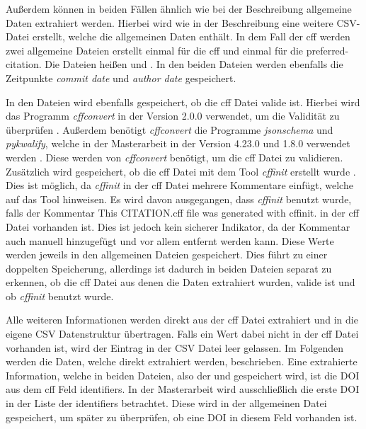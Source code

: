 Außerdem können in beiden Fällen ähnlich wie bei der Beschreibung allgemeine Daten extrahiert werden.
Hierbei wird wie in der Beschreibung eine weitere CSV-Datei erstellt, welche die allgemeinen Daten enthält.
In dem Fall der \gls{cff} werden zwei allgemeine Dateien erstellt einmal für die \gls{cff} und einmal für die \glqq preferred-citation\grqq{}.
Die Dateien heißen  und .
In den beiden Dateien werden ebenfalls die Zeitpunkte \emph{commit date} und \emph{author date} gespeichert.

In den Dateien wird ebenfalls gespeichert, ob die \gls{cff} Datei valide ist.
Hierbei wird das Programm \emph{cffconvert} in der Version 2.0.0 verwendet, um die Validität zu überprüfen \autocite{spaaks_cffconvert_2021}.
Außerdem benötigt \emph{cffconvert} die Programme \emph{jsonschema} und \emph{pykwalify}, welche in der Masterarbeit in der Version 4.23.0 und 1.8.0 verwendet werden \autocites{noauthor_python-jsonschemajsonschema_2024}{grokzen_grokzenpykwalify_2024}.
Diese werden von \emph{cffconvert} benötigt, um die \gls{cff} Datei zu validieren.
Zusätzlich wird gespeichert, ob die \gls{cff} Datei mit dem Tool \emph{cffinit} erstellt wurde \autocite{spaaks_cffinit_2023}.
Dies ist möglich, da \emph{cffinit} in der \gls{cff} Datei mehrere Kommentare einfügt, welche auf das Tool hinweisen.
Es wird davon ausgegangen, dass \emph{cffinit} benutzt wurde, falls der Kommentar \glqq This CITATION.cff file was generated with cffinit.\grqq{} in der \gls{cff} Datei vorhanden ist.
Dies ist jedoch kein sicherer Indikator, da der Kommentar auch manuell hinzugefügt und vor allem entfernt werden kann.
Diese Werte werden jeweils in den allgemeinen Dateien gespeichert.
Dies führt zu einer doppelten Speicherung, allerdings ist dadurch in beiden Dateien separat zu erkennen, ob die \gls{cff} Datei aus denen die Daten extrahiert wurden, valide ist und ob \emph{cffinit} benutzt wurde.

Alle weiteren Informationen werden direkt aus der \gls{cff} Datei extrahiert und in die eigene CSV Datenstruktur übertragen.
Falls ein Wert dabei nicht in der \gls{cff} Datei vorhanden ist, wird der Eintrag in der CSV Datei leer gelassen.
Im Folgenden werden die Daten, welche direkt extrahiert werden, beschrieben.
Eine extrahierte Information, welche in beiden Dateien, also der  und  gespeichert wird, ist die DOI aus dem \gls{cff} Feld \glqq identifiers\grqq{}.
In der Masterarbeit wird ausschließlich die erste DOI in der Liste der \glqq identifiers\grqq{} betrachtet.
Diese wird in der allgemeinen Datei gespeichert, um später zu überprüfen, ob eine DOI in diesem Feld vorhanden ist.

